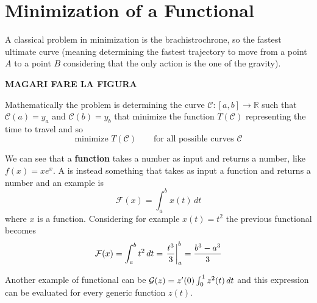 \chapter{Minimization of a Functional}
	
	A classical problem in minimization is the brachistrochrone, so the fastest ultimate curve (meaning determining the fastest trajectory to move from a point $A$ to a point $B$ considering that the only action is the one of the gravity).
	
	\textbf{MAGARI FARE LA FIGURA}
	
	Mathematically the problem is determining the curve $\mathcal C: [a,b] \rightarrow \mathds R$ such that $\mathcal C(a) = y_a$ and $\mathcal C(b) = y_b$ that minimize the function $T(\mathcal C)$ representing the time to travel and so
	\[ \textrm{minimize } T(\mathcal C) \qquad \textrm{for all possible curves } \mathcal C \]
	
	We can see that a \textbf{function} takes a number as input and returns a number, like $f(x) = x e^x$. A  is instead something that takes as input a function and returns a number and an example is
	\[ \mathcal F (x) = \int_a^b x(t)\, dt  \]
	where $x$ is a function. Considering for example $x(t) = t^2$ the previous functional  becomes
	\[ \mathcal{F}(x) = \int_a^b t^2\, dt = \left. \frac{t^3}{3}\right|_a^b= \frac{b^3-a^3}{3}\]
	
	Another example of functional can be $\mathcal{G}(z) = z'(0) \int_0^1 z^2(t)\, dt$ and this expression can be evaluated for every generic function $z(t)$.	\vspace{3mm}
	
